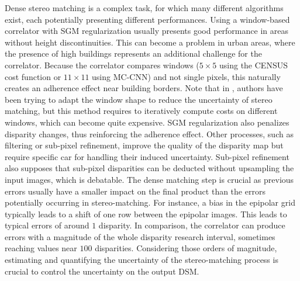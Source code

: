 Dense stereo matching is a complex task, for which many different algorithms exist, each potentially presenting different performances. Using a window-based correlator with SGM regularization usually presents good performance in areas without height discontinuities. This can become a problem in urban areas, where the presence of high buildings represents an additional challenge for the correlator. Because the correlator compares windows ($5\times5$ using the CENSUS cost function or $11\times11$ using MC-CNN) and not single pixels, this naturally creates an adherence effect near building borders. Note that in \cite{okutomi_stereo_1994}, authors have been trying to adapt the window shape to reduce the uncertainty of stereo matching, but this method requires to iteratively compute costs on different windows, which can become quite expensive. SGM regularization also penalizes disparity changes, thus reinforcing the adherence effect. Other processes, such as filtering or sub-pixel refinement, improve the quality of the disparity map but require specific car for handling their induced uncertainty. Sub-pixel refinement also supposes that sub-pixel disparities can be deducted without upsampling the input images, which is debatable. The dense matching step is crucial as previous errors usually have a smaller impact on the final product than the errors potentially occurring in stereo-matching. For instance, a bias in the epipolar grid typically leads to a shift of one row between the epipolar images. This leads to typical errors of around $1$ disparity. In comparison, the correlator can produce errors with a magnitude of the whole disparity research interval, sometimes reaching values near $100$ disparities. Considering those orders of magnitude, estimating and quantifying the uncertainty of the stereo-matching process is crucial to control the uncertainty on the output DSM. 

